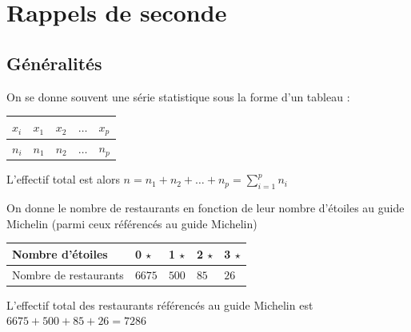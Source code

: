 \section{Rappels de seconde}
\subsection{Généralités}
\newline

\newline

On se donne souvent une série statistique sous la forme d'un tableau : \newline

\begin{tabularx}{\linewidth}{|X|X|X|X|X|}
\hline
$x_i$ & $x_1$ & $x_2$ & $\ldots$ & $x_p$\\ \hline
$n_i$ & $n_1$ & $n_2$ & $\ldots$ & $n_p$ \\ \hline
\end{tabularx}

L'effectif total est alors $\displaystyle n = n_1+n_2+\ldots + n_p = \sum_{i=1}^p n_i$\newline


\begin{exemple}
On donne le nombre de restaurants en fonction de leur nombre d'étoiles au guide Michelin (parmi ceux référencés au guide Michelin)\newline


\begin{tabularx}{\linewidth}{|X|X|X|X|X|}
\hline
Nombre d'étoiles & 0 $\star$ & 1 $\star$ & 2 $\star$ & 3 $\star$\\ \hline
Nombre de restaurants & $6675$ & $500$ & $85$ & $26$ \\ \hline
\end{tabularx}


L'effectif total des restaurants référencés au guide Michelin est $6675 + 500 + 85 + 26 = 7286$
\end{exemple}

